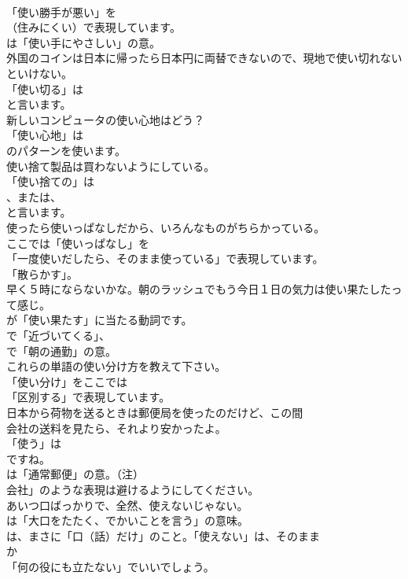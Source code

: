 \documentclass[8pt]{extreport}
\begin{document}
\begin{CJK}{UTF8}{min}
\\	「使い勝手が悪い」を 
\\	（住みにくい）で表現しています。
\\	は「使い手にやさしい」の意。	
\\	外国のコインは日本に帰ったら日本円に両替できないので、現地で使い切れないといけない。 
\\	「使い切る」は
\\	と言います。	
\\	新しいコンピュータの使い心地はどう？ 
\\	「使い心地」は
\\	のパターンを使います。	
\\	使い捨て製品は買わないようにしている。 
\\	「使い捨ての」は
\\	、または、
\\	と言います。	
\\	使ったら使いっぱなしだから、いろんなものがちらかっている。 
\\	ここでは「使いっぱなし」を
\\	「一度使いだしたら、そのまま使っている」で表現しています。
\\	「散らかす」。	
\\	早く５時にならないかな。朝のラッシュでもう今日１日の気力は使い果たしたって感じ。 
\\	が「使い果たす」に当たる動詞です。
\\	で「近づいてくる」、
\\	で「朝の通勤」の意。	
\\	これらの単語の使い分け方を教えて下さい。 
\\	「使い分け」をここでは
\\	「区別する」で表現しています。	
\\	日本から荷物を送るときは郵便局を使ったのだけど、この間
\\	会社の送料を見たら、それより安かったよ。 
\\	「使う」は 
\\	ですね。
\\	は「通常郵便」の意。（注）
\\	会社」のような表現は避けるようにしてください。	
\\	あいつ口ばっかりで、全然、使えないじゃない。 
\\	は「大口をたたく、でかいことを言う」の意味。
\\	は、まさに「口（話）だけ」のこと。「使えない」は、そのまま
\\	か
\\	「何の役にも立たない」でいいでしょう。	

\end{CJK}
\end{document}
